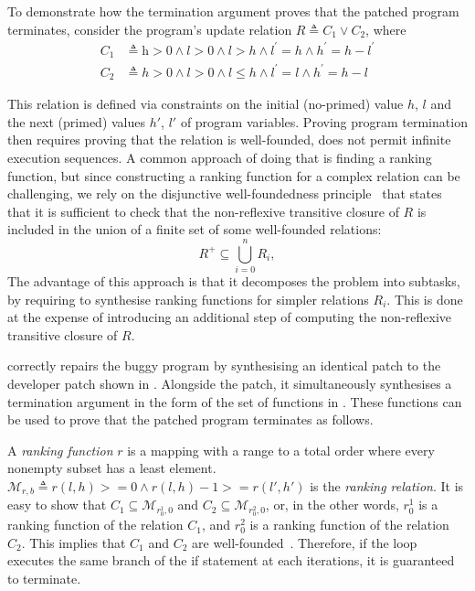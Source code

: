 To demonstrate how the termination argument proves that the patched program terminates, consider the program's update relation $R \triangleq C_1 \vee C_2$, where
\begin{align*}
    C_1 &\triangleq \mathrm{h} > 0 \land l > 0 \land l >  h  \land l^\prime = h \land h^\prime = h - l^\prime\\
    C_2 &\triangleq h > 0 \land l > 0 \land l \le h  \land l^\prime = l \land h^\prime = h - l
\end{align*}

  This relation is defined via constraints on the initial (no-primed) value $h$, $l$ and the next (primed) values $h'$, $l'$ of program variables. Proving program termination then requires proving that the relation is well-founded, \ie does not permit infinite execution sequences. A common approach of doing that is finding a ranking function, but since constructing a ranking function for a complex relation can be challenging, we rely on the disjunctive well-foundedness principle~\cite{podelski2004Ti} that states that it is sufficient to check that the non-reflexive transitive closure of $R$ is included in the union of a finite set of some well-founded relations:
\begin{equation}\label{eq:disjunctive}
  R^+\subseteq \bigcup_{i=0}^n R_i,
\end{equation}
\noindent The advantage of this approach is that it decomposes the problem into subtasks, by requiring to synthesise ranking functions for simpler relations $R_i$. This is done at the expense of introducing an additional step of computing the non-reflexive transitive closure of $R$.

\projName correctly repairs the buggy program by synthesising an identical patch to the developer patch shown in . Alongside the patch, it simultaneously synthesises a termination argument in the form of the set of functions in . These functions can be used to prove that the patched program terminates as follows.

A \emph{ranking function} $r$ is a mapping with a range to a total order where every nonempty subset has a least element. $\mathcal{M}_{r,b} \triangleq r(l,h) >= 0 \land r(l,h) - 1 >= r(l',h')$ is the \emph{ranking relation}. It is easy to show that $C_1 \subseteq \mathcal{M}_{r_0^1,0}$ and $C_2 \subseteq \mathcal{M}_{r_0^2,0}$, or, in the other words, $r_0^1$ is a ranking function of the relation $C_1$, and $r_0^2$ is a ranking function of the relation $C_2$. This implies that $C_1$ and $C_2$ are well-founded~\cite{cook2009priciples}. Therefore, if the loop executes the same branch of the if statement at each iterations, it is guaranteed to terminate.

